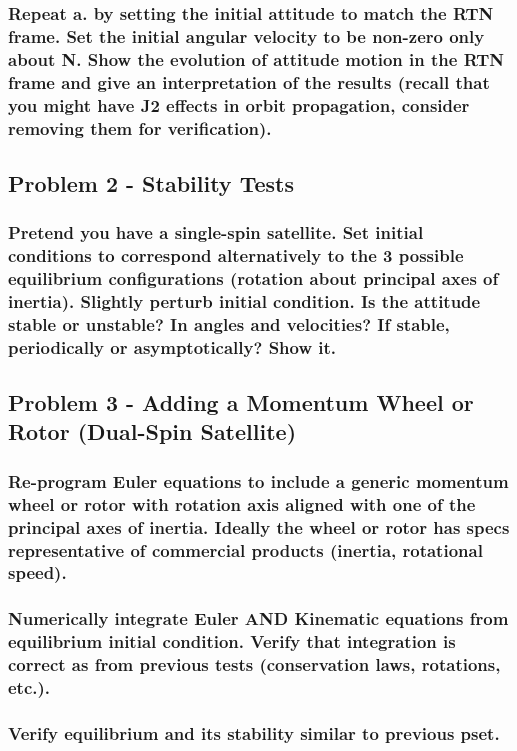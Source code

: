 \subsubsection{Repeat a. by setting the initial attitude to match the RTN frame. Set the initial angular velocity to
be non-zero only about N. Show the evolution of attitude motion in the RTN frame and give an
interpretation of the results (recall that you might have J2 effects in orbit propagation, consider
removing them for verification).}

\subsection{Problem 2 - Stability Tests}

\subsubsection{Pretend you have a single-spin satellite. Set initial conditions to correspond alternatively to the 3
possible equilibrium configurations (rotation about principal axes of inertia). Slightly perturb initial
condition. Is the attitude stable or unstable? In angles and velocities? If stable, periodically or
asymptotically? Show it.}

\subsection{Problem 3 - Adding a Momentum Wheel or Rotor (Dual-Spin Satellite)}

\subsubsection{Re-program Euler equations to include a generic momentum wheel or rotor with rotation axis
aligned with one of the principal axes of inertia. Ideally the wheel or rotor has specs representative
of commercial products (inertia, rotational speed).}

\subsubsection{Numerically integrate Euler AND Kinematic equations from equilibrium initial condition. Verify
that integration is correct as from previous tests (conservation laws, rotations, etc.).}

\subsubsection{Verify equilibrium and its stability similar to previous pset.}


